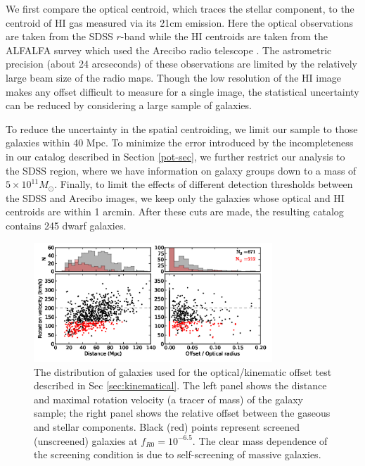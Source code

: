 \documentclass[twocolappendix, numberedappendix]{emulateapj}
\begin{document}
We first  compare the optical centroid, which traces
the stellar component, to the centroid of HI gas measured via its 21cm emission. 
Here the optical observations are taken from the SDSS $r$-band \citep{aba09}
while the HI centroids
are taken from the ALFALFA survey which used the Arecibo radio telescope
\citep{giovanelli2005, gio07, sai08,ken08,mar09}.
The astrometric precision (about 24 arcseconds) 
of these observations are limited by the
relatively large beam size of the radio maps.
Though the low resolution of the HI image makes any offset difficult to
measure for a single image,
the statistical uncertainty can be reduced by considering a large sample of
galaxies.

To  reduce the  uncertainty in the spatial centroiding,
we limit our sample to those galaxies within 40 Mpc.
To minimize the error introduced by the incompleteness in our catalog described
in Section \ref{pot-sec}, we further  restrict our analysis to the SDSS region,
where  we have information on galaxy groups down to a mass of
$5\times 10^{11}M_\odot$.  Finally, to limit the
effects of different detection thresholds between the SDSS and Arecibo
images, we keep only the galaxies whose optical and HI centroids are
within 1 arcmin.  After these cuts are made, the resulting catalog
contains 245 dwarf galaxies.


\begin{figure}
\begin{center}
  \includegraphics[width=0.8\textwidth]{figures/sec4_2_scatter.png}
  \caption{The distribution of galaxies used for the optical/kinematic offset
  test described in Sec
    \ref{sec:kinematical}.  The left panel shows the distance and maximal
    rotation velocity (a tracer of mass) of the galaxy sample; the right
    panel shows the relative offset between the gaseous and stellar components.
    Black (red) points represent screened (unscreened) galaxies at
    $f_{R0} = 10^{-6.5}$.  The clear mass dependence of the screening condition
    is due to self-screening of massive galaxies.}
  \label{offset-kin-den-1}
\end{center}
\end{figure}
\end{document}
